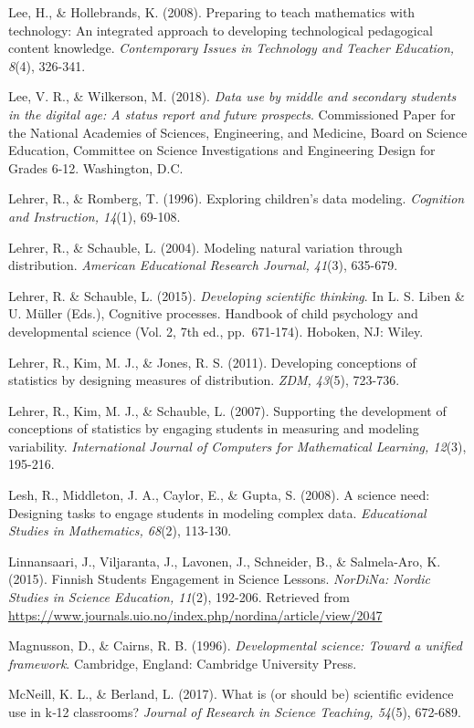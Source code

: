 \documentclass[]{msu-thesis}
\theoremstyle{definition}
\theoremstyle{definition}
\theoremstyle{definition}
\theoremstyle{remark}
\begin{document}
Lee, H., \& Hollebrands, K. (2008). Preparing to teach mathematics with
technology: An integrated approach to developing technological
pedagogical content knowledge. \emph{Contemporary Issues in Technology
and Teacher Education, 8}(4), 326-341.

Lee, V. R., \& Wilkerson, M. (2018). \emph{Data use by middle and
secondary students in the digital age: A status report and future
prospects}. Commissioned Paper for the National Academies of Sciences,
Engineering, and Medicine, Board on Science Education, Committee on
Science Investigations and Engineering Design for Grades 6-12.
Washington, D.C.

Lehrer, R., \& Romberg, T. (1996). Exploring children's data modeling.
\emph{Cognition and Instruction, 14}(1), 69-108.

Lehrer, R., \& Schauble, L. (2004). Modeling natural variation through
distribution. \emph{American Educational Research Journal, 41}(3),
635-679.

Lehrer, R. \& Schauble, L. (2015). \emph{Developing scientific
thinking}. In L. S. Liben \& U. Müller (Eds.), Cognitive processes.
Handbook of child psychology and developmental science (Vol. 2, 7th ed.,
pp.~671-174). Hoboken, NJ: Wiley.

Lehrer, R., Kim, M. J., \& Jones, R. S. (2011). Developing conceptions
of statistics by designing measures of distribution. \emph{ZDM, 43}(5),
723-736.

Lehrer, R., Kim, M. J., \& Schauble, L. (2007). Supporting the
development of conceptions of statistics by engaging students in
measuring and modeling variability. \emph{International Journal of
Computers for Mathematical Learning, 12}(3), 195-216.

Lesh, R., Middleton, J. A., Caylor, E., \& Gupta, S. (2008). A science
need: Designing tasks to engage students in modeling complex data.
\emph{Educational Studies in Mathematics, 68}(2), 113-130.

Linnansaari, J., Viljaranta, J., Lavonen, J., Schneider, B., \&
Salmela-Aro, K. (2015). Finnish Students Engagement in Science Lessons.
\emph{NorDiNa: Nordic Studies in Science Education, 11}(2), 192-206.
Retrieved from
\url{https://www.journals.uio.no/index.php/nordina/article/view/2047}

Magnusson, D., \& Cairns, R. B. (1996). \emph{Developmental science:
Toward a unified framework}. Cambridge, England: Cambridge University
Press.

McNeill, K. L., \& Berland, L. (2017). What is (or should be) scientific
evidence use in k‐12 classrooms? \emph{Journal of Research in Science
Teaching, 54}(5), 672-689.
\end{document}
